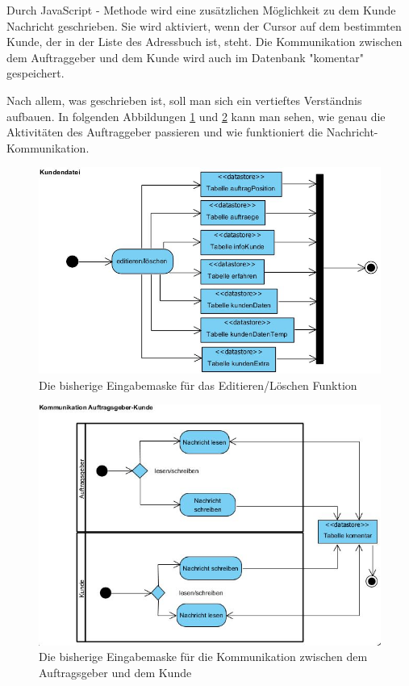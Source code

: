 Durch JavaScript - Methode wird eine zusätzlichen Möglichkeit zu dem Kunde Nachricht geschrieben. Sie wird aktiviert, wenn der Cursor auf dem bestimmten Kunde, der in der Liste des Adressbuch ist, steht. Die Kommunikation zwischen dem Auftraggeber und dem  Kunde wird auch im Datenbank "komentar" gespeichert. 

Nach allem, was geschrieben ist, soll man sich ein vertieftes Verständnis aufbauen. In folgenden Abbildungen \ref{fig:Kunden Datei Editieren und Löschen} und \ref{fig:Kommunikation Auftraggeber Kunde} kann man sehen, wie genau die Aktivitäten des Auftraggeber passieren und wie funktioniert die Nachricht-Kommunikation.
\pagebreak


\begin{figure}[h]
	\centering
	\includegraphics[width=0.7\linewidth]{Graphics/Kundendatei.JPG}
	\caption[Kundeansicht]{Die bisherige Eingabemaske für das Editieren/Löschen Funktion}
	\label{fig:Kunden Datei Editieren und Löschen}
\end{figure}

\begin{figure}[h]
	\centering
	\includegraphics[width=0.7\linewidth]{Graphics/Kommunikation.JPG}
	\caption[Kundeansicht]{Die bisherige Eingabemaske für die Kommunikation zwischen dem Auftragsgeber und dem Kunde}
	\label{fig:Kommunikation Auftraggeber Kunde}
\end{figure}

